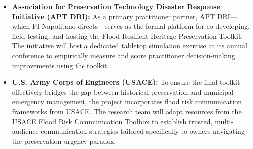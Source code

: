 \documentclass[11pt]{article}
\begin{document}
\begin{itemize}
\begin{itemize}
    \item \textbf{Association for Preservation Technology Disaster Response Initiative (APT DRI):} As a primary practitioner partner, APT DRI—which PI Napolitano directs—serves as the formal platform for co-developing, field-testing, and hosting the Flood-Resilient Heritage Preservation Toolkit. The initiative will host a dedicated tabletop simulation exercise at its annual conference to empirically measure and score practitioner decision-making improvements using the toolkit.
    \item \textbf{U.S. Army Corps of Engineers (USACE):} To ensure the final toolkit effectively bridges the gap between historical preservation and municipal emergency management, the project incorporates flood risk communication frameworks from USACE. The research team will adapt resources from the USACE Flood Risk Communication Toolbox to establish trusted, multi-audience communication strategies tailored specifically to owners navigating the preservation-urgency paradox.
\end{itemize}


\end{itemize}
\end{document}

